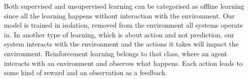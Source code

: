 \documentclass[a4paper]{article}
\begin{document}
Both supervised and unsupervised learning can be categorised as offline learning since all the learning happens without interaction with the environment. Our model is trained in isolation, removed from the environment all systems operate in. In another type of learning, which is about action and not prediction, our system interacts with the environment and the actions it takes will impact the environment. Reinforcement learning belongs to that class, where an agent interacts with an environment and observes what happens. Each action leads to some kind of reward and an observation as a feedback.
\end{document}
